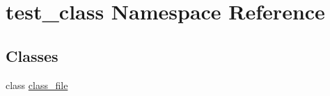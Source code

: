 \hypertarget{namespacetest__class}{\section{test\-\_\-class Namespace Reference}
\label{namespacetest__class}
}
\subsection*{Classes}
\begin{DoxyCompactItemize}
\item 
class \hyperlink{classtest__class_1_1class__file}{class\-\_\-file}
\end{DoxyCompactItemize}
